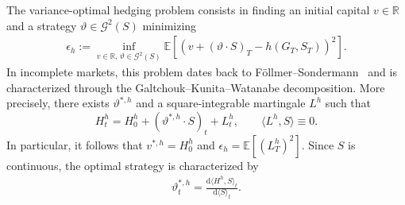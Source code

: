 \documentclass[10pt,a4paper,reqno]{amsart}
\theoremstyle{plain}
\theoremstyle{definition}
\theoremstyle{remark}
\theoremstyle{example}
\begin{document}
The variance-optimal hedging problem consists in finding an initial capital $v\in\mathbb R$ and a strategy $\vartheta\in\mathcal G^2(S)$ minimizing
\begin{align}\label{eq:vo-problem}
    \epsilon_h := \inf_{v\in\mathbb R,\, \vartheta\in\mathcal G^2(S)} \mathbb E\left[ \left( v+(\vartheta\cdot S)_T-h(G_T,S_T) \right)^2 \right].
\end{align}
In incomplete markets, this problem dates back to F\"ollmer--Sondermann~\cite{Foellmer1985} and is characterized through the Galtchouk--Kunita--Watanabe decomposition. More precisely, there exists $\vartheta^{*,h}$ and a square-integrable martingale $L^h$ such that
\[
    H_t^h = H_0^h + (\vartheta^{*,h}\cdot S)_t + L_t^h, \qquad \langle L^h,S\rangle\equiv0.
\]
In particular, it follows that $v^{*,h}=H_0^h$ and $\epsilon_h = \mathbb E[(L_T^h)^2]$. Since $S$ is continuous, the optimal strategy is characterized by
\begin{align}\label{eq:var-opt-rn-deriv}
    \vartheta_t^{*,h} = \frac{\mathrm d\langle H^h,S\rangle_t}{\mathrm d\langle S\rangle_t}.
\end{align}
\end{document}
